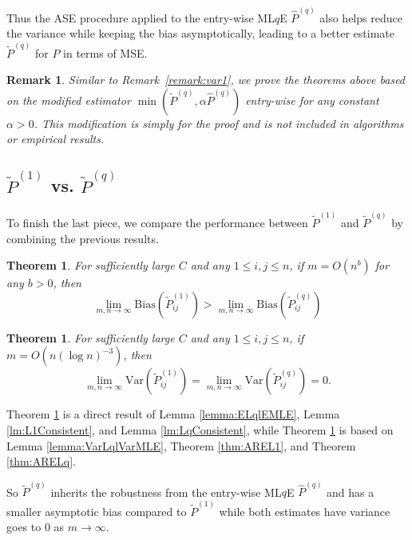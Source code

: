 \documentclass[a4paper]{article}
\newtheorem{theorem}[fact]{Theorem}
\newtheorem{remark}[fact]{Remark}
\renewcommand{\hat}{\widehat}
\begin{document}
Thus the ASE procedure applied to the entry-wise ML$q$E $\hat{P}^{(q)}$ also helps reduce the variance while keeping the bias asymptotically, leading to a better estimate $\widetilde{P}^{(q)}$ for $P$ in terms of MSE.

\begin{remark}
Similar to Remark~\ref{remark:var1}, we prove the theorems above based on the modified estimator $\min(\widetilde{P}^{(q)}, \alpha \hat{P}^{(q)})$ entry-wise for any constant $\alpha > 0$. This modification is simply for the proof and is not included in algorithms or empirical results.
\end{remark}

\subsection{$\widetilde{P}^{(1)}$ vs. $\widetilde{P}^{(q)}$}

To finish the last piece, we compare the performance between $\widetilde{P}^{(1)}$ and $\widetilde{P}^{(q)}$ by combining the previous results.

\begin{theorem}
\label{thm:biasL1andLq}
For sufficiently large $C$ and any $1 \le i,j \le n$, if $m = O(n^b)$ for any $b > 0$, then
\[
	\lim_{m, n \to \infty} \mathrm{Bias}(\widetilde{P}_{ij}^{(1)})
    > \lim_{m, n \to \infty} \mathrm{Bias}(\widetilde{P}_{ij}^{(q)})
\]
\end{theorem}

\begin{theorem}
\label{thm:varianceL1andLq}
For sufficiently large $C$ and any $1 \le i,j \le n$, if $m = O(n (\log n)^{-3})$, then
\[
	\lim_{m, n \to \infty} \mathrm{Var}(\widetilde{P}_{ij}^{(1)})
    = \lim_{m, n \to \infty} \mathrm{Var}(\widetilde{P}_{ij}^{(q)}) = 0.
\]
\end{theorem}

Theorem \ref{thm:biasL1andLq} is a direct result of Lemma \ref{lemma:ELqlEMLE}, Lemma \ref{lm:L1Consistent}, and Lemma \ref{lm:LqConsistent}, while Theorem \ref{thm:varianceL1andLq} is based on Lemma \ref{lemma:VarLqlVarMLE}, Theorem \ref{thm:AREL1}, and Theorem \ref{thm:ARELq}.

So $\widetilde{P}^{(q)}$ inherits the robustness from the entry-wise ML$q$E $\hat{P}^{(q)}$ and has a smaller asymptotic bias compared to $\widetilde{P}^{(1)}$ while both estimates have variance goes to 0 as $m \to \infty$.
\end{document}
